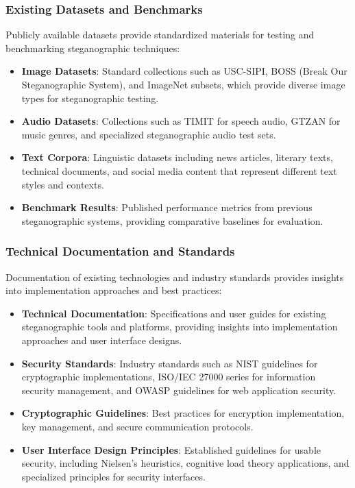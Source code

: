 \documentclass[12pt, a4paper, oneside]{book}
\begin{document}
\subsubsection{Existing Datasets and Benchmarks}
Publicly available datasets provide standardized materials for testing and benchmarking steganographic techniques:

\begin{itemize}[leftmargin=*]
    \item \textbf{Image Datasets}: Standard collections such as USC-SIPI, BOSS (Break Our Steganographic System), and ImageNet subsets, which provide diverse image types for steganographic testing.

    \item \textbf{Audio Datasets}: Collections such as TIMIT for speech audio, GTZAN for music genres, and specialized steganographic audio test sets.

    \item \textbf{Text Corpora}: Linguistic datasets including news articles, literary texts, technical documents, and social media content that represent different text styles and contexts.

    \item \textbf{Benchmark Results}: Published performance metrics from previous steganographic systems, providing comparative baselines for evaluation.
\end{itemize}

\subsubsection{Technical Documentation and Standards}
Documentation of existing technologies and industry standards provides insights into implementation approaches and best practices:

\begin{itemize}[leftmargin=*]
    \item \textbf{Technical Documentation}: Specifications and user guides for existing steganographic tools and platforms, providing insights into implementation approaches and user interface designs.

    \item \textbf{Security Standards}: Industry standards such as NIST guidelines for cryptographic implementations, ISO/IEC 27000 series for information security management, and OWASP guidelines for web application security.

    \item \textbf{Cryptographic Guidelines}: Best practices for encryption implementation, key management, and secure communication protocols.

    \item \textbf{User Interface Design Principles}: Established guidelines for usable security, including Nielsen's heuristics, cognitive load theory applications, and specialized principles for security interfaces.
\end{itemize}
\end{document}
